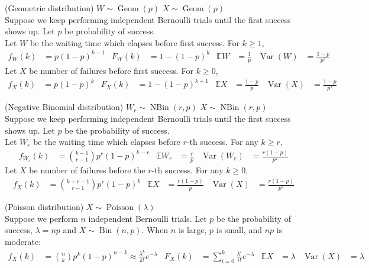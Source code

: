 \documentclass{huhtakm-template-book}
\newcommand{\expect}{\mathbb{E}}
\DeclareMathOperator{\Bin}{Bin}
\DeclareMathOperator{\NBin}{NBin}
\DeclareMathOperator{\Geom}{Geom}
\DeclareMathOperator{\Poisson}{Poisson}
\DeclareMathOperator{\Var}{Var}
\begin{document}
    \begin{seg}(Geometric distribution) $W\sim\Geom(p)$ $X\sim\Geom(p)$\\
        Suppose we keep performing independent Bernoulli trials until the first success shows up. Let $p$ be probability of success.\\
        Let $W$ be the waiting time which elapses before first success. For $k\geq 1$,
        \begin{align*}
            f_{W}(k)&=p(1-p)^{k-1} & F_{W}(k)&=1-(1-p)^{k} & \expect W&=\frac{1}{p} & \Var(W)&=\frac{1-p}{p^{2}}
        \end{align*}
        Let $X$ be number of failures before first success. For $k\geq 0$,
        \begin{align*}
            f_{X}(k)&=p(1-p)^{k} & F_{X}(k)&=1-(1-p)^{k+1} & \expect X&=\frac{1-p}{p} & \Var(X)&=\frac{1-p}{p^{2}}
        \end{align*}
    \end{seg}
    \begin{seg}(Negative Binomial distribution) $W_{r}\sim\NBin(r,p)$ $X\sim\NBin(r,p)$\\
        Suppose we keep performing independent Bernoulli trials until the first success shows up. Let $p$ be the probability of success.\\
        Let $W_{r}$ be the waiting time which elapses before $r$-th success. For any $k\geq r$,
        \begin{align*}
            f_{W_{r}}(k)&=\binom{k-1}{r-1}p^{r}(1-p)^{k-r} & \expect W_{r}&=\frac{r}{p} & \Var(W_{r})&=\frac{r(1-p)}{p^{2}}
        \end{align*}
        Let $X$ be number of failures before the $r$-th success. For any $k\geq 0$,
        \begin{align*}
            f_{X}(k)&=\binom{k+r-1}{r-1}p^{r}(1-p)^{k} & \expect X&=\frac{r(1-p)}{p} & \Var(X)&=\frac{r(1-p)}{p^{2}}
        \end{align*}
    \end{seg}
    \begin{seg}(Poisson distribution) $X\sim\Poisson(\lambda)$\\
        Suppose we perform $n$ independent Bernoulli trials. Let $p$ be the probability of success, $\lambda=np$ and $X\sim\Bin(n,p)$. When $n$ is large, $p$ is small, and $np$ is moderate:
        \begin{align*}
            f_{X}(k)&=\binom{n}{k}p^{k}(1-p)^{n-k}\approx\frac{\lambda^{k}}{k!}e^{-\lambda} & F_{X}(k)&=\sum_{i=0}^{k}\frac{\lambda^{i}}{i!}e^{-\lambda} & \expect X&=\lambda & \Var(X)&=\lambda
        \end{align*}
    \end{seg}
\end{document}
